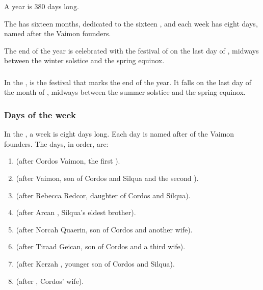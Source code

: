 A year is 380 days long. 

The \ImperialCalendar has sixteen months, dedicated to the sixteen \Sephiroth{}, and each week has eight days, named after the Vaimon founders. 

The end of the year is celebrated with the festival of \Camaire{} on the last day of \Gamishiel{}, midways between the winter solstice and the spring equinox. 





\subsubsection{\Camaire}
\index{\Camaire}
In the \VaimonCalendar, \Camaire{} is the festival that marks the end of the year. It falls on the last day of the month of \Gamishiel{}, midways between the summer solstice and the spring equinox.





\subsubsection{Days of the week}
\index{\Corjin}
\index{\Zetherab}
\index{\Rebecab}
\index{\Arcab}
\index{\Norquin}
\index{\Tirjin}
\index{\Kerzab}
\index{\Siljin}
In the \ImperialCalendar, a week is eight days long. Each day is named after of the Vaimon founders. 
The days, in order, are:

\begin{enumerate}
  \item \Corjin (after Cordos Vaimon, the first \VaimonCaliph).
  \item \Zetherab (after \Zether Vaimon, son of Cordos and Silqua and the second \caliph).
  \item \Rebecab (after Rebecca Redcor, daughter of Cordos and Silqua).
  \item \Arcab (after Arcan \Delaen, Silqua's eldest brother).
  \item \Norquin (after Norcah Quaerin, son of Cordos and another wife).
  \item \Tirjin (after Tiraad Geican, son of Cordos and a third wife).
  \item \Kerzab (after Kerzah \Irgel, younger son of Cordos and Silqua).
  \item \Siljin (after , Cordos' wife). 
\end{enumerate}





